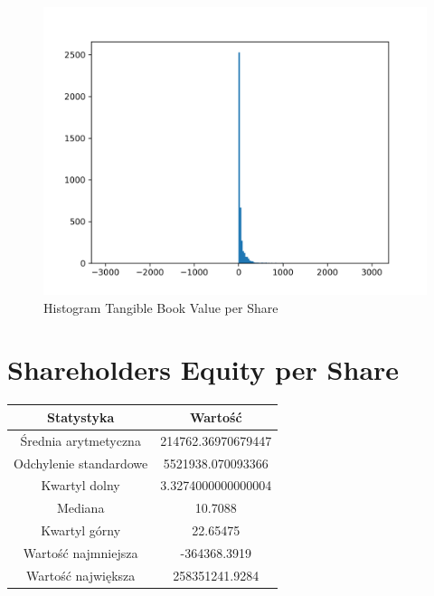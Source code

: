 \documentclass{article}
\begin{document}
\begin{figure}[h!]
    \includegraphics[width=\linewidth]{variables/Tangible Book Value per Share.png}
    \caption{Histogram Tangible Book Value per Share }
\end{figure}\section{ Shareholders Equity per Share }

\begin{center}
    \begin{tabular}{|c | c|} 
    \hline
    Statystyka & Wartość \\
    \hline\hline
    Średnia arytmetyczna & 214762.36970679447 \\ 
    \hline
    Odchylenie standardowe & 5521938.070093366 \\
    \hline
    Kwartyl dolny & 3.3274000000000004 \\
    \hline
    Mediana & 10.7088 \\
    \hline
    Kwartyl górny & 22.65475 \\
    \hline
    Wartość najmniejsza & -364368.3919 \\
    \hline
    Wartość największa & 258351241.9284 \\
    \hline
   \end{tabular}
\end{center}
\end{document}
